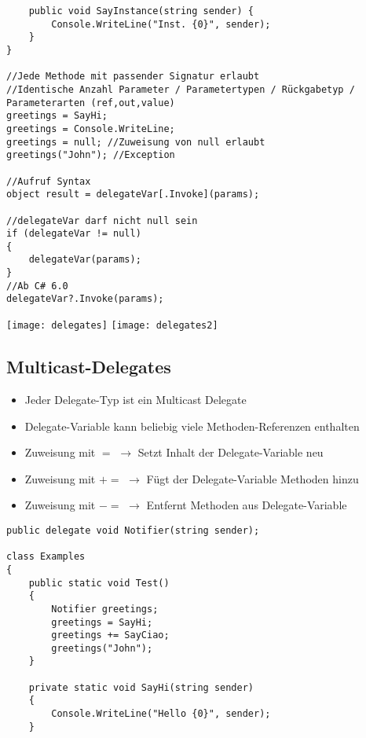 \begin{multicols*}{2}
\begin{lstlisting}
    public void SayInstance(string sender) {
        Console.WriteLine("Inst. {0}", sender);
    }
}

//Jede Methode mit passender Signatur erlaubt 
//Identische Anzahl Parameter / Parametertypen / Rückgabetyp / Parameterarten (ref,out,value)
greetings = SayHi;
greetings = Console.WriteLine;
greetings = null; //Zuweisung von null erlaubt
greetings("John"); //Exception

//Aufruf Syntax
object result = delegateVar[.Invoke](params);

//delegateVar darf nicht null sein
if (delegateVar != null) 
{
    delegateVar(params);
}
//Ab C# 6.0 
delegateVar?.Invoke(params);
\end{lstlisting}
\texttt{[image: delegates]}
\texttt{[image: delegates2]}
\subsection{Multicast-Delegates}
\begin{itemize}
    \item Jeder Delegate-Typ ist ein Multicast Delegate
    \item Delegate-Variable kann beliebig viele Methoden-Referenzen enthalten
    \item Zuweisung mit $=$  $\rightarrow$ Setzt Inhalt der Delegate-Variable neu
    \item Zuweisung mit $+=$  $\rightarrow$ Fügt der Delegate-Variable Methoden hinzu
    \item Zuweisung mit $-=$  $\rightarrow$ Entfernt Methoden aus Delegate-Variable
\end{itemize}
\begin{lstlisting}
public delegate void Notifier(string sender);

class Examples
{
    public static void Test()
    {
        Notifier greetings; 
        greetings = SayHi; 
        greetings += SayCiao;
        greetings("John");
    }
    
    private static void SayHi(string sender)
    {
        Console.WriteLine("Hello {0}", sender);
    }
    

\end{lstlisting}
\end{multicols*}
